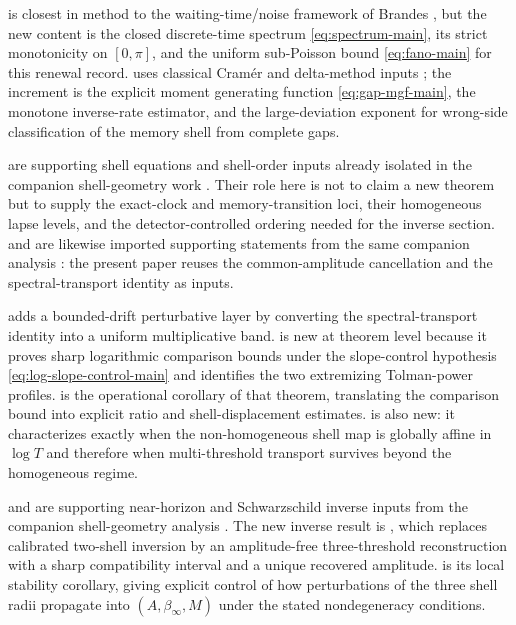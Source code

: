 \documentclass[11pt]{article}
\theoremstyle{definition}
\begin{document}
 is closest in method to the waiting-time/noise framework of Brandes \cite{Brandes2008}, but the new content is the closed discrete-time spectrum \eqref{eq:spectrum-main}, its strict monotonicity on $[0,\pi]$, and the uniform sub-Poisson bound \eqref{eq:fano-main} for this renewal record.  uses classical Cram\'er and delta-method inputs \cite{DemboZeitouni1998,vanDerVaart1998}; the increment is the explicit moment generating function \eqref{eq:gap-mgf-main}, the monotone inverse-rate estimator, and the large-deviation exponent for wrong-side classification of the memory shell from complete gaps.

 are supporting shell equations and shell-order inputs already isolated in the companion shell-geometry work \cite{MaZhang2026ShellGeometry}. Their role here is not to claim a new theorem but to supply the exact-clock and memory-transition loci, their homogeneous lapse levels, and the detector-controlled ordering needed for the inverse section.  and  are likewise imported supporting statements from the same companion analysis \cite[Theorem~4.28; Corollary~4.29]{MaZhang2026ShellGeometry}: the present paper reuses the common-amplitude cancellation and the spectral-transport identity as inputs.

 adds a bounded-drift perturbative layer by converting the spectral-transport identity into a uniform multiplicative band.  is new at theorem level because it proves sharp logarithmic comparison bounds under the slope-control hypothesis \eqref{eq:log-slope-control-main} and identifies the two extremizing Tolman-power profiles.  is the operational corollary of that theorem, translating the comparison bound into explicit ratio and shell-displacement estimates.  is also new: it characterizes exactly when the non-homogeneous shell map is globally affine in $\log T$ and therefore when multi-threshold transport survives beyond the homogeneous regime.

 and  are supporting near-horizon and Schwarzschild inverse inputs from the companion shell-geometry analysis \cite{MaZhang2026ShellGeometry}. The new inverse result is , which replaces calibrated two-shell inversion by an amplitude-free three-threshold reconstruction with a sharp compatibility interval and a unique recovered amplitude.  is its local stability corollary, giving explicit control of how perturbations of the three shell radii propagate into $(A,\beta_\infty,M)$ under the stated nondegeneracy conditions.
\end{document}
